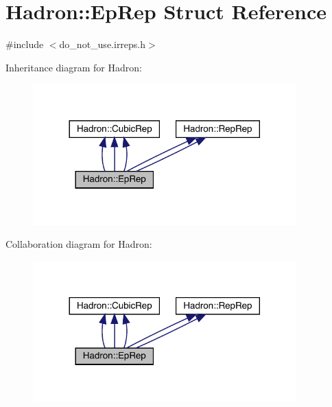 \hypertarget{structHadron_1_1EpRep}{}\section{Hadron\+:\+:Ep\+Rep Struct Reference}
\label{structHadron_1_1EpRep}


{\ttfamily \#include $<$do\+\_\+not\+\_\+use.\+irreps.\+h$>$}



Inheritance diagram for Hadron\+:
\nopagebreak
\begin{figure}[H]
\begin{center}
\leavevmode
\includegraphics[width=288pt]{d8/de2/structHadron_1_1EpRep__inherit__graph}
\end{center}
\end{figure}


Collaboration diagram for Hadron\+:
\nopagebreak
\begin{figure}[H]
\begin{center}
\leavevmode
\includegraphics[width=288pt]{d0/d43/structHadron_1_1EpRep__coll__graph}
\end{center}
\end{figure}
